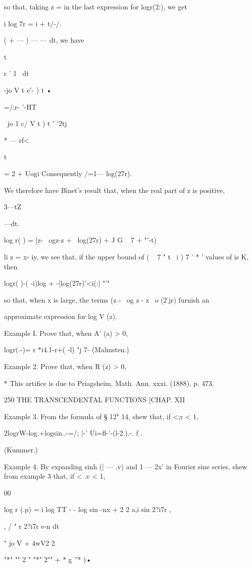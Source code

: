 so that, taking z = in the last expression for logr(2:), we get

i log 7r = i + t/-/.

( + — ) — — dt, we have

t

r ' 1 \ dt

-jo V t e'- ) t •

=/:r- '-HT

~jo 1 c/ V t ) t ' '2tj

* — rf<

t

= 2 + Uogi Consequently /=1— log(27r).

We therefore have Binet's result that, when the real part of z is
positive,

3—tZ

 —dt.

log r( ) = [z- \ ogz-z + \ log(27r) + J G ~ 7 + "'-t)

li z = x- iy, we see that, if the upper bound of ( ~ 7 " t \ i ) 7 ' *
' values of is K, then

logr( )-( -i)log + -|log(27r)'<i(:| "'"

so that, when x is large, the terms (z - \ og z - z \ o (2'jr) furnish
an

approximate expression for log V (z).

Example I. Prove that, when A' (a) > 0,

logr(.-)= r *i4.1-r+( -l) "j 7- (Malmsten.)

Example 2. Prove that, when R (z) > 0,

* This artifice is due to Priagsheim, Math. Ann. xxxi. (1888), p. 473.

250 THE TRANSCENDENTAL FUNCTIONS [CHAP. XII

Example 3. From the formula of § 12" 14, shew that, if <;r < 1,

2logrW-log.+logsin..-=/; |-' Ui=fl-'-(l-2.).-. f .

(Kummer.)

Example 4. By expanding sinh (| — .v) and 1 — 2x' in Fourier sine
series, shew from example 3 that, if < .v < 1,

00

log r (.p) = i log TT - - log sin -nx + 2 2 a,i sin 2?i7r ,

, / " r 2?i7r e-n dt

" jo V + 4wV2 2%

"*" "" 2 " "*" 2"" + * g ''* )•

